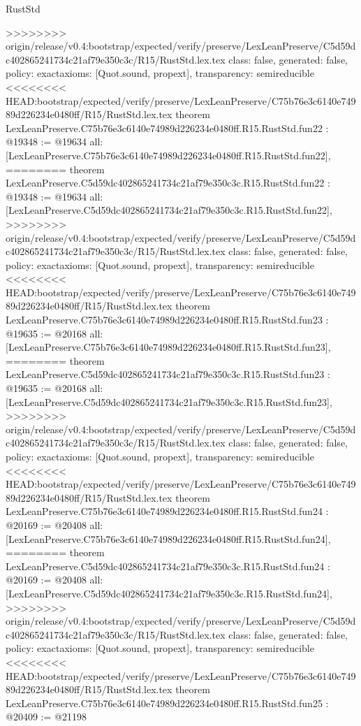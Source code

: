 \begin{lexlean}{RustStd}
\begin{coremodule}
{\begin{coremodule}
{{{{{{{{{{{{{{{{{{{{{{{{{>>>>>>>> origin/release/v0.4:bootstrap/expected/verify/preserve/LexLeanPreserve/C5d59dc402865241734c21af79e350c3c/R15/RustStd.lex.tex
  class: false,
  generated: false,
  policy: exact{axioms: [Quot.sound, propext]},
  transparency: semireducible
}
<<<<<<<< HEAD:bootstrap/expected/verify/preserve/LexLeanPreserve/C75b76e3c6140e74989d226234e0480ff/R15/RustStd.lex.tex
theorem LexLeanPreserve.C75b76e3c6140e74989d226234e0480ff.R15.RustStd.fun22 : @19348 := @19634 {
  all: [LexLeanPreserve.C75b76e3c6140e74989d226234e0480ff.R15.RustStd.fun22],
========
theorem LexLeanPreserve.C5d59dc402865241734c21af79e350c3c.R15.RustStd.fun22 : @19348 := @19634 {
  all: [LexLeanPreserve.C5d59dc402865241734c21af79e350c3c.R15.RustStd.fun22],
>>>>>>>> origin/release/v0.4:bootstrap/expected/verify/preserve/LexLeanPreserve/C5d59dc402865241734c21af79e350c3c/R15/RustStd.lex.tex
  class: false,
  generated: false,
  policy: exact{axioms: [Quot.sound, propext]},
  transparency: semireducible
}
<<<<<<<< HEAD:bootstrap/expected/verify/preserve/LexLeanPreserve/C75b76e3c6140e74989d226234e0480ff/R15/RustStd.lex.tex
theorem LexLeanPreserve.C75b76e3c6140e74989d226234e0480ff.R15.RustStd.fun23 : @19635 := @20168 {
  all: [LexLeanPreserve.C75b76e3c6140e74989d226234e0480ff.R15.RustStd.fun23],
========
theorem LexLeanPreserve.C5d59dc402865241734c21af79e350c3c.R15.RustStd.fun23 : @19635 := @20168 {
  all: [LexLeanPreserve.C5d59dc402865241734c21af79e350c3c.R15.RustStd.fun23],
>>>>>>>> origin/release/v0.4:bootstrap/expected/verify/preserve/LexLeanPreserve/C5d59dc402865241734c21af79e350c3c/R15/RustStd.lex.tex
  class: false,
  generated: false,
  policy: exact{axioms: [Quot.sound, propext]},
  transparency: semireducible
}
<<<<<<<< HEAD:bootstrap/expected/verify/preserve/LexLeanPreserve/C75b76e3c6140e74989d226234e0480ff/R15/RustStd.lex.tex
theorem LexLeanPreserve.C75b76e3c6140e74989d226234e0480ff.R15.RustStd.fun24 : @20169 := @20408 {
  all: [LexLeanPreserve.C75b76e3c6140e74989d226234e0480ff.R15.RustStd.fun24],
========
theorem LexLeanPreserve.C5d59dc402865241734c21af79e350c3c.R15.RustStd.fun24 : @20169 := @20408 {
  all: [LexLeanPreserve.C5d59dc402865241734c21af79e350c3c.R15.RustStd.fun24],
>>>>>>>> origin/release/v0.4:bootstrap/expected/verify/preserve/LexLeanPreserve/C5d59dc402865241734c21af79e350c3c/R15/RustStd.lex.tex
  class: false,
  generated: false,
  policy: exact{axioms: [Quot.sound, propext]},
  transparency: semireducible
}
<<<<<<<< HEAD:bootstrap/expected/verify/preserve/LexLeanPreserve/C75b76e3c6140e74989d226234e0480ff/R15/RustStd.lex.tex
theorem LexLeanPreserve.C75b76e3c6140e74989d226234e0480ff.R15.RustStd.fun25 : @20409 := @21198 {
}}}}}}}}}}}}}}}}}}}}}}}}}}}}
\end{coremodule}}
\end{coremodule}
\end{lexlean}
